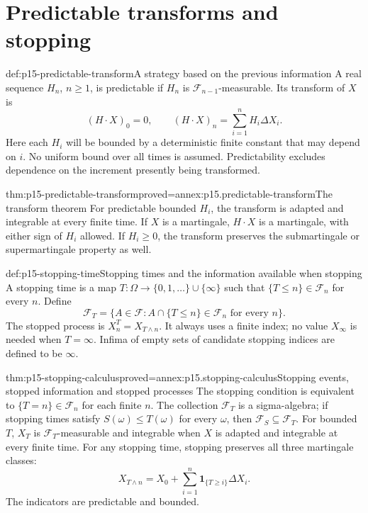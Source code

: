 \section{Predictable transforms and stopping}
\label{sec:p15-martingale-stopping}

\begin{hbdefinition}{def:p15-predictable-transform}{A strategy based on the previous information}
A real sequence \(H_n\), \(n\geq1\), is predictable if \(H_n\) is
\(\mathcal F_{n-1}\)-measurable. Its transform of \(X\) is
\[
                    (H\cdot X)_0=0,\qquad
                    (H\cdot X)_n=\sum_{i=1}^nH_i\Delta X_i.
\]
Here each \(H_i\) will be bounded by a deterministic finite constant
that may depend on \(i\). No uniform bound over all times is assumed.
Predictability excludes dependence on the increment presently being transformed.
\end{hbdefinition}

\begin{hbtheorem}{thm:p15-predictable-transform}{proved=annex:p15.predictable-transform}{The transform theorem}
For predictable bounded \(H_i\), the transform is adapted and integrable
at every finite time.
If \(X\) is a martingale, \(H\cdot X\) is a martingale, with either sign
of \(H_i\) allowed.
If \(H_i\geq0\), the transform preserves the submartingale or
supermartingale property as well.
\end{hbtheorem}

\begin{hbdefinition}{def:p15-stopping-time}{Stopping times and the information available when stopping}
A stopping time is a map \(T:\Omega\to\{0,1,\ldots\}\cup\{\infty\}\)
such that \(\{T\leq n\}\in\mathcal F_n\) for every \(n\).
Define
\[
 \mathcal F_T=\{A\in\mathcal F:
                       A\cap\{T\leq n\}\in\mathcal F_n\text{ for every }n\}.
\]
The stopped process is \(X^T_n=X_{T\wedge n}\).
It always uses a finite index; no value \(X_\infty\) is needed when \(T=\infty\).
Infima of empty sets of candidate stopping indices are defined to be \(\infty\).
\end{hbdefinition}

\begin{hbtheorem}{thm:p15-stopping-calculus}{proved=annex:p15.stopping-calculus}{Stopping events, stopped information and stopped processes}
The stopping condition is equivalent to
\(\{T=n\}\in\mathcal F_n\) for each finite \(n\).
The collection \(\mathcal F_T\) is a sigma-algebra; if stopping times
satisfy \(S(\omega)\leq T(\omega)\) for every \(\omega\), then
\(\mathcal F_S\subseteq\mathcal F_T\).
For bounded \(T\), \(X_T\) is \(\mathcal F_T\)-measurable and integrable
when \(X\) is adapted and integrable at every finite time.
For any stopping time, stopping preserves all three martingale classes:
\[
                        X_{T\wedge n}
                            =X_0+\sum_{i=1}^n\mathbf1_{\{T\geq i\}}\Delta X_i.
\]
The indicators are predictable and bounded.
\end{hbtheorem}

